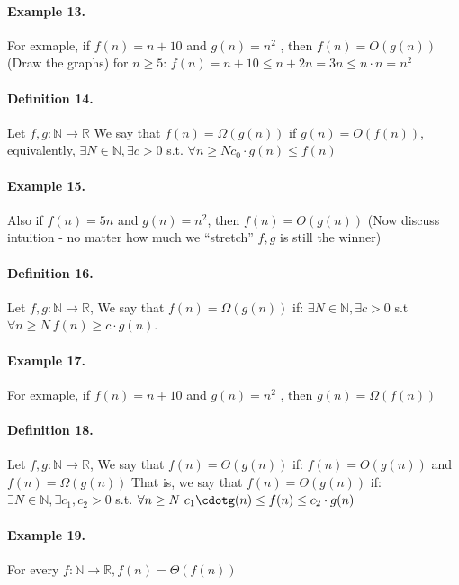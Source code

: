 \paragraph{Example 13.} For exmaple, if \(f(n) = n + 10 \) and \( g(n) = n^2\)
, then \(f(n) = O(g(n)) \) (Draw the graphs) for \(n \ge 5 \):
\(f(n) = n + 10 \le n + 2n = 3n \le n \cdot n = n^2\)
\paragraph{Definition 14.} Let \( f, g : \mathbb{N} \rightarrow \mathbb{R} \)
We say that \(f(n) = \Omega(g(n))\) if \(g(n) = O(f(n))\), equivalently,
\( \exists N \in \mathbb{N}, \exists c > 0 \) s.t. \( \forall n \ge N c_0· g(n) \le f(n) \)
\paragraph{Example 15.} Also if \( f(n) = 5n\) and \(g(n) = n^2\), then \(f(n) = O(g(n))\) (Now discuss intuition - no matter how much we “stretch” \(f, g\) is still the winner)
\paragraph{Definition 16.} Let \( f, g : \mathbb{N} \rightarrow \mathbb{R} \), We say that \(f(n) = \Omega(g(n))\) if:
\( \exists N \in \mathbb{N}, \exists c > 0 \) s.t \( \forall n \ge N \ f(n) \ge c \cdot g(n) \).

\paragraph{Example 17.} For exmaple, if \(f(n) = n + 10\) and \(g(n) = n^2\)
, then \(g(n) = \Omega(f(n))\)

\paragraph{Definition 18.} Let \( f, g : \mathbb{N} \rightarrow \mathbb{R} \), We say that \(f(n) = \Theta(g(n))\) if:
\(f(n) = O(g(n))\) and \(f(n) = \Omega(g(n))\)
That is, we say that \(f(n) = \Theta(g(n))\) if:
\( \exists N \in \mathbb{N}, \exists c_1, c_2 > 0\) s.t. \(\forall n \ge N \ c_1\cdotg(n) \le f(n) \le c_2 \cdot g(n)\)

\paragraph{Example 19.} For every \(f : \mathbb{N} \rightarrow \mathbb{R}, f(n) = \Theta(f(n))\)
